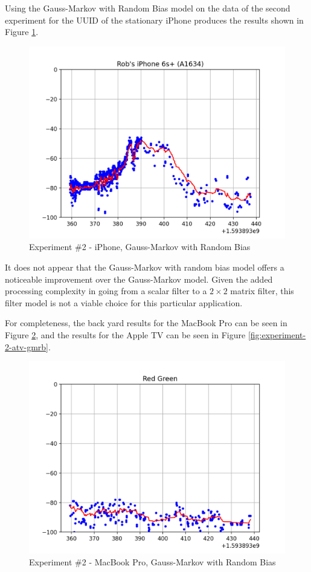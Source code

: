 \documentclass[12pt]{article}
\begin{document}
Using the Gauss-Markov with Random Bias model on the data of the second experiment for
the UUID of the stationary iPhone produces the results shown in Figure
\ref{fig:experiment-2-iphone-gmrb}.

\begin{figure}[ht]
    \centering
    \includegraphics[width=1.0\textwidth]{Experiment-2-iPhone-GMRB.png}
    \caption{Experiment \#2 - iPhone, Gauss-Markov with Random Bias}
    \label{fig:experiment-2-iphone-gmrb}
\end{figure}

It does not appear that the Gauss-Markov with random bias model offers a noticeable
improvement over the Gauss-Markov model. Given the added processing complexity in going
from a scalar filter to a $2 \times 2$ matrix filter, this filter model is not a viable
choice for this particular application.

For completeness, the back yard results for the MacBook Pro can be seen in Figure
\ref{fig:experiment-2-mbp-gmrb}, and the results for the Apple TV can be seen in Figure
\ref{fig:experiment-2-atv-gmrb}.

\begin{figure}[ht]
    \centering
    \includegraphics[width=1.0\textwidth]{Experiment-2-MBP-GMRB.png}
    \caption{Experiment \#2 - MacBook Pro, Gauss-Markov with Random Bias}
    \label{fig:experiment-2-mbp-gmrb}
\end{figure}
\end{document}

